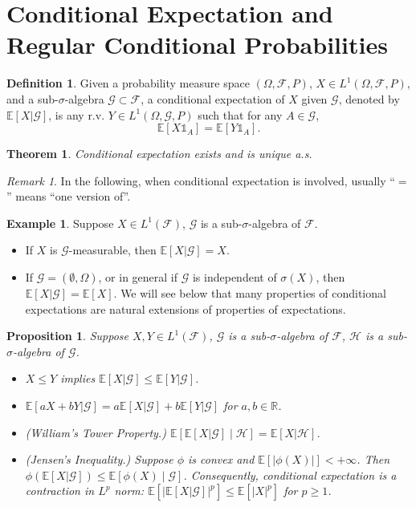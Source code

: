 \documentclass[openany]{book}
\newtheorem{proposition}{Proposition}[chapter]
\newtheorem{theorem}{Theorem}[chapter]
\theoremstyle{definition}
\newtheorem{definition}{Definition}[chapter]
\newtheorem{example}{Example}[chapter]
\theoremstyle{remark}
\newtheorem*{remark}{Remark}
\begin{document}
\section{Conditional Expectation and Regular Conditional Probabilities}
\begin{definition}
    Given a probability measure space $(\Omega,\mathcal{F},P)$, $X\in L^1(\Omega,\mathcal{F},P)$, and a sub-$\sigma$-algebra $\mathcal{G}\subset \mathcal{F}$, a conditional expectation of $X$ given $\mathcal{G}$, denoted by $\mathbb{E}[X|\mathcal{G}]$, is any r.v. $Y\in L^1(\Omega,\mathcal{G},P)$ such that for any $A\in \mathcal{G}$,
    \begin{equation}
        \mathbb{E}[X\mathds{1}_A]=\mathbb{E}[Y\mathds{1}_A].
    \end{equation}
\end{definition}
\begin{theorem}
    Conditional expectation exists and is unique a.s.
\end{theorem}
\begin{remark}
    In the following, when conditional expectation is involved, usually ``$=$'' means ``one version of''.
\end{remark}
\begin{example}
    Suppose $X\in L^1(\mathcal{F})$, $\mathcal{G}$ is a sub-$\sigma$-algebra of $\mathcal{F}$.
    \begin{itemize}
        \item If $X$ is $\mathcal{G}$-measurable, then $\mathbb{E}[X|\mathcal{G}]=X$.
        \item If $\mathcal{G}=(\emptyset,\Omega)$, or in general if $\mathcal{G}$ is independent of $\sigma(X)$, then $\mathbb{E}[X|\mathcal{G}]=\mathbb{E}[X]$. We will see below that many properties of conditional expectations are natural extensions of properties of expectations.
    \end{itemize}
\end{example}
\begin{proposition}
    Suppose $X,Y\in L^1(\mathcal{F})$, $\mathcal{G}$ is a sub-$\sigma$-algebra of $\mathcal{F}$, $\mathcal{H}$ is a sub-$\sigma$-algebra of $\mathcal{G}$.
    \begin{itemize}
        \item $X\le Y$ implies $\mathbb{E}[X|\mathcal{G}]\le \mathbb{E}[Y|\mathcal{G}]$.
        \item $\mathbb{E}[aX+bY|\mathcal{G}]=a \mathbb{E}[X|\mathcal{G}]+b \mathbb{E}[Y|\mathcal{G}]$ for $a,b\in \mathbb{R}$.
        \item (William's Tower Property.) $\mathbb{E}\left[\mathbb{E}[X|\mathcal{G}]\middle|\mathcal{H}\right]=\mathbb{E}[X|\mathcal{H}]$.
        \item (Jensen's Inequality.) Suppose $\phi$ is convex and $\mathbb{E}\left[|\phi(X)|\right]<+\infty$. Then $\phi\left(\mathbb{E}[X|\mathcal{G}]\right)\le \mathbb{E}\left[\phi(X)\middle|\mathcal{G}\right]$. Consequently, conditional expectation is a contraction in $L^p$ norm: $\mathbb{E}\left[\left|\mathbb{E}[X|\mathcal{G}]\right|^p\right]\le \mathbb{E}\left[|X|^p\right]$ for $p\ge1$.
    \end{itemize}
\end{proposition}
\end{document}
